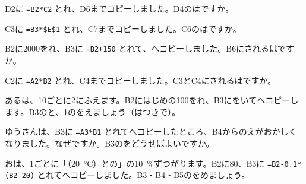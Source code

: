 \bkproblem D2に \texttt{=B2*C2} とれ、D6までコピーしました。D4のはですか。

\bkproblem C3に \texttt{=B3*\$E\$1} とれ、C7までコピーしました。C6のはですか。

\bkproblem B2に2000をれ、B3に \texttt{=B2+150} とれて、へコピーしました。B6にされるはですか。

\bkproblem \begin{minipage}[t]{0.4\linewidth}
C2に \texttt{=A2*B2} とれ、C4までコピーしました。C3とC4にされるはですか。
\end{minipage}\hfill
\begin{minipage}[t]{0.52\linewidth}\vspace{0pt}\raggedleft
{}
\end{minipage}\par
{}


\bkproblem あるは、10ごとに2にふえます。B2にはじめの100をれ、B3にをいてへコピーします。B3のと、1のをえましょう（はつきで）。

\bkproblem ゆうさんは、B3に \texttt{=A3*B1} とれてへコピーしたところ、B4からのえがおかしくなりました。なぜですか。B3のをどうせばよいですか。

\bkproblem おは、1ごとに「（\qty{20}{\degreeCelsius}）との」の\qty{10}{\percent}ずつがります。B2に80、B3に \texttt{=B2-0.1*(B2-20)} とれてへコピーしました。B3・B4・B5のをめましょう。

